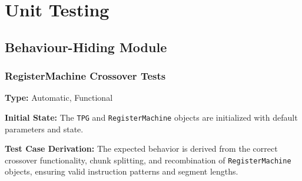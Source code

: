 \documentclass[12pt, titlepage]{article}
\begin{document}
\section{Unit Testing}

\subsection{Behaviour-Hiding Module}

\subsubsection{RegisterMachine Crossover Tests}

\textbf{Type:} Automatic, Functional

\textbf{Initial State:} The \texttt{TPG} and \texttt{RegisterMachine} objects are initialized with default parameters and state.

\textbf{Test Case Derivation:} The expected behavior is derived from the correct crossover functionality, chunk splitting, and recombination of \texttt{RegisterMachine} objects, ensuring valid instruction patterns and segment lengths.
\end{document}

